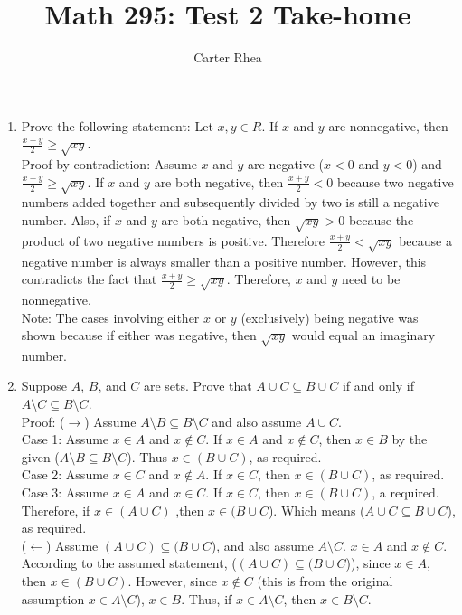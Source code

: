 \documentclass[10pt,a4paper]{article}
\author{Carter Rhea}
\title{Math 295: Test 2 Take-home}
\begin{document}
\maketitle
\begin{enumerate}
\item Prove the following statement:  Let $x,y \in R $. If $x$ and $y$ are nonnegative, then $\frac{x+y}{2} \geq \sqrt{xy} $.\\
Proof by contradiction: Assume $x$ and $y$ are negative ($x<0$ and $y < 0$) and $\frac{x+y}{2} \geq \sqrt{xy}$. If $x$ and $y$ are both negative, then $\frac{x+y}{2}<0$ because two negative numbers added together and subsequently divided by two is still a negative number. Also, if $x$ and $y$ are both negative, then $\sqrt{xy} >0$ because the product of two negative numbers is positive. Therefore $\frac{x+y}{2} < \sqrt{xy}$ because a negative number is always smaller than a positive number. However, this contradicts the fact that $\frac{x+y}{2} \geq \sqrt{xy}$. Therefore, $x$ and $y$ need to be nonnegative. \\
Note: The cases involving either $x$ or $y$ (exclusively) being negative was shown because if either was negative, then $\sqrt{xy}$ would equal an imaginary number.\\
\item Suppose $A$, $B$, and $C$ are sets. Prove that $A \cup C \subseteq B \cup C$ if and only if $A \setminus C \subseteq B \setminus C$.\\
Proof: ($\rightarrow$) Assume $A \setminus B \subseteq B \setminus C$ and also assume $A \cup C$. \\
Case 1: Assume $ x\in A$ and $x \not \in C$. If $x \in A$ and $x \not \in C$, then $x \in B$ by the given ($A \setminus B \subseteq B \setminus C$). Thus $x \in (B \cup C)$, as required.\\
Case 2: Assume $x \in C$ and $x \not \in A$. If $x \in C$, then $x \in (B \cup C)$, as required.\\
Case 3: Assume $x \in A$ and $x \in C$. If $x \in C$, then $x\in (B \cup C)$, a required. \\
Therefore, if $x \in (A \cup C)$ ,then $x \in (B \cup C$). Which means ($A \cup C \subseteq B \cup C$), as required.\\
($\leftarrow$) Assume $(A \cup C) \subseteq (B \cup C$), and also assume $A \setminus C$. $x \in A$ and $x \not \in C$. According to the assumed statement, ($(A \cup C) \subseteq (B \cup C$)), since $x \in A$, then $x \in (B \cup C)$. However, since $x \not \in C$ (this is from the original assumption $x \in A \setminus C$), $x \in B$. Thus, if $x \in A \setminus C$, then $x \in B \setminus C$. \\

\end{enumerate}
\end{document}
